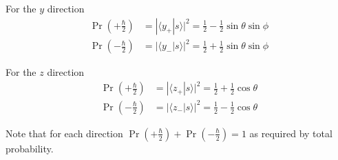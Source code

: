 For the $y$ direction
\begin{align*}
\Pr\left(+\tfrac{\hbar}{2}\right)&=|\langle y_+|s\rangle|^2=\tfrac{1}{2}-\tfrac{1}{2}\sin\theta\sin\phi
\\
\Pr\left(-\tfrac{\hbar}{2}\right)&=|\langle y_-|s\rangle|^2=\tfrac{1}{2}+\tfrac{1}{2}\sin\theta\sin\phi
\end{align*}

For the $z$ direction
\begin{align*}
\Pr\left(+\tfrac{\hbar}{2}\right)&=|\langle z_+|s\rangle|^2=\tfrac{1}{2}+\tfrac{1}{2}\cos\theta
\\
\Pr\left(-\tfrac{\hbar}{2}\right)&=|\langle z_-|s\rangle|^2=\tfrac{1}{2}-\tfrac{1}{2}\cos\theta
\end{align*}

Note that for each direction $\Pr\left(+\tfrac{\hbar}{2}\right)+\Pr\left(-\tfrac{\hbar}{2}\right)=1$
as required by total probability.


